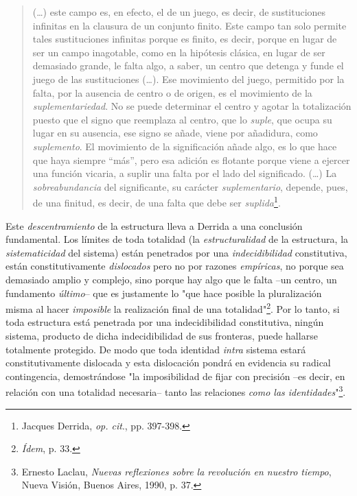 \documentclass{book}
\begin{document}
\begin{quote}
(\dots) este campo es, en efecto, el de un juego, es decir, de
sustituciones infinitas en la clausura de un conjunto finito. Este campo
tan solo permite tales sustituciones infinitas porque es finito, es
decir, porque en lugar de ser un campo inagotable, como en la hipótesis
clásica, en lugar de ser demasiado grande, le falta algo, a saber, un
centro que detenga y funde el juego de las sustituciones (\dots).
Ese movimiento del juego, permitido por la falta, por la ausencia de
centro o de origen, es el movimiento de la \emph{suplementariedad}. No
se puede determinar el centro y agotar la totalización puesto que el
signo que reemplaza al centro, que lo \emph{suple}, que ocupa su lugar
en su ausencia, ese signo se añade, viene por añadidura, como
\emph{suplemento}. El movimiento de la significación añade algo, es lo
que hace que haya siempre ``más'', pero esa adición es flotante porque
viene a ejercer una función vicaria, a suplir una falta por el lado del
significado. (\dots) La \emph{sobreabundancia} del significante, su
carácter \emph{suplementario}, depende, pues, de una finitud, es decir,
de una falta que debe ser \emph{suplida}\footnote{Jacques Derrida,
  \emph{op. cit}., pp. 397-398.}.
\end{quote}

Este \emph{descentramiento} de la estructura lleva a Derrida a una
conclusión fundamental. Los límites de toda totalidad (la
\emph{estructuralidad} de la estructura, la \emph{sistematicidad} del
sistema) están penetrados por una \emph{indecidibilidad} constitutiva,
están constitutivamente \emph{dislocados} pero no por razones
\emph{empíricas}, no porque sea demasiado amplio y complejo, sino porque
hay algo que le falta --un centro, un fundamento \emph{último}-- que es
justamente lo "que hace posible la pluralización misma al hacer
\emph{imposible} la realización final de una totalidad"\footnote{\emph{Ídem},
  p. 33.}. Por lo tanto, si toda estructura está penetrada por una
indecidibilidad constitutiva, ningún sistema, producto de dicha
indecidibilidad de sus fronteras, puede hallarse totalmente protegido.
De modo que toda identidad \emph{intra} sistema estará constitutivamente
dislocada y esta dislocación pondrá en evidencia su radical
contingencia, demostrándose "la imposibilidad de fijar con precisión
--es decir, en relación con una totalidad necesaria-- tanto las
relaciones \emph{como las identidades}"\footnote{Ernesto Laclau,
  \emph{Nuevas reflexiones sobre la revolución en nuestro tiempo}, Nueva
  Visión, Buenos Aires, 1990, p. 37.}.
\end{document}
